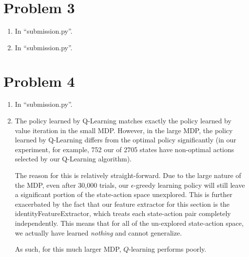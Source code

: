 \documentclass[12pt]{article}
\begin{document}
\section*{Problem 3}

\begin{enumerate}[label=(\alph*)]
  \item In ``submission.py''.
  \item In ``submission.py''.
\end{enumerate}

\section*{Problem 4}
\begin{enumerate}[label=(\alph*)]
  \item In ``submission.py''.
  \item The policy learned by Q-Learning matches exactly the policy learned by value iteration in the small MDP. However, in the large MDP, the policy learned by Q-Learning differs from the optimal policy significantly (in our experiment, for example, 752 our of 2705 states have non-optimal actions selected by our Q-Learning algorithm). 

  The reason for this is relatively straight-forward. Due to the large nature of the MDP, even after 30,000 trials, our $\epsilon$-greedy learning policy will still leave a significant portion of the state-action space unexplored. This is further exacerbated by the fact that our feature extractor for this section is the identityFeatureExtractor, which treats each state-action pair completely independently. This means that for all of the un-explored state-action space, we actually have learned \textit{nothing} and cannot generalize.

  As such, for this much larger MDP, $Q$-learning performs poorly.
\end{enumerate}
\end{document}
